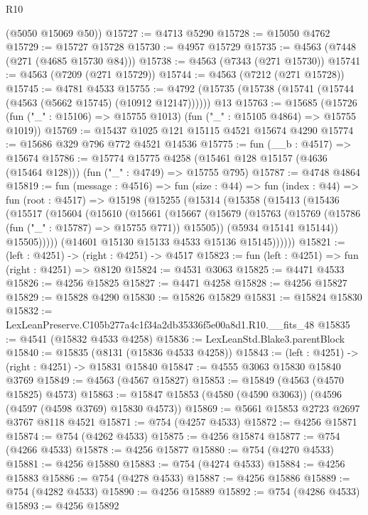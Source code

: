 \begin{lexlean}{R10}
\begin{coremodule}
      (@5050 @15069 @50))
@15727 := @4713 @5290
@15728 := @15050 @4762
@15729 := @15727 @15728
@15730 := @4957 @15729
@15735 := @4563 (@7448 (@271 (@4685 @15730 @84)))
@15738 := @4563 (@7343 (@271 @15730))
@15741 := @4563 (@7209 (@271 @15729))
@15744 := @4563 (@7212 (@271 @15728))
@15745 := @4781 @4533
@15755 := @4792 (@15735 (@15738 (@15741 (@15744 (@4563 (@5662 @15745) (@10912 @12147)))))) @13
@15763 := @15685
    (@15726 (fun ("_" : @15106) => @15755 @1013) (fun ("_" : @15105 @4864) => @15755 @1019))
@15769 := @15437 @1025 @121 @15115 @4521 @15674 @4290
@15774 := @15686 @329 @796 @772 @4521 @14536
@15775 := fun (__b : @4517) => @15674
@15786 := @15774
    @15775
    @4258
    (@15461 @128 @15157 (@4636 (@15464 @128)))
    (fun ("_" : @4749) => @15755 @795)
@15787 := @4748 @4864
@15819 := fun (message : @4516) =>
  fun (size : @44) =>
  fun (index : @44) =>
  fun (root : @4517) =>
  @15198
    (@15255
      (@15314
        (@15358
          (@15413
            (@15436
              (@15517
                (@15604
                  (@15610
                    (@15661
                      (@15667
                        (@15679
                          (@15763 (@15769 (@15786 (fun ("_" : @15787) => @15755 @771)) @15505))
                          (@5934 @15141 @15144))
                        @15505)))))
              (@14601 @15130 @15133 @4533 @15136 @15145))))))
@15821 := (left : @4251) -> (right : @4251) -> @4517
@15823 := fun (left : @4251) => fun (right : @4251) => @8120
@15824 := @4531 @3063
@15825 := @4471 @4533
@15826 := @4256 @15825
@15827 := @4471 @4258
@15828 := @4256 @15827
@15829 := @15828 @4290
@15830 := @15826 @15829
@15831 := @15824 @15830
@15832 := LexLeanPreserve.C105b277a4c1f34a2db35336f5e00a8d1.R10.__fits_48
@15835 := @4541 (@15832 @4533 @4258)
@15836 := LexLeanStd.Blake3.parentBlock
@15840 := @15835 (@8131 (@15836 @4533 @4258))
@15843 := (left : @4251) -> (right : @4251) -> @15831 @15840
@15847 := @4555 @3063 @15830 @15840 @3769
@15849 := @4563 (@4567 @15827)
@15853 := @15849 (@4563 (@4570 @15825) @4573)
@15863 := @15847 @15853 (@4580 (@4590 @3063)) (@4596 (@4597 (@4598 @3769) @15830 @4573))
@15869 := @5661 @15853 @2723 @2697 @3767 @8118 @4521
@15871 := @754 (@4257 @4533)
@15872 := @4256 @15871
@15874 := @754 (@4262 @4533)
@15875 := @4256 @15874
@15877 := @754 (@4266 @4533)
@15878 := @4256 @15877
@15880 := @754 (@4270 @4533)
@15881 := @4256 @15880
@15883 := @754 (@4274 @4533)
@15884 := @4256 @15883
@15886 := @754 (@4278 @4533)
@15887 := @4256 @15886
@15889 := @754 (@4282 @4533)
@15890 := @4256 @15889
@15892 := @754 (@4286 @4533)
@15893 := @4256 @15892

\end{coremodule}
\end{lexlean}
